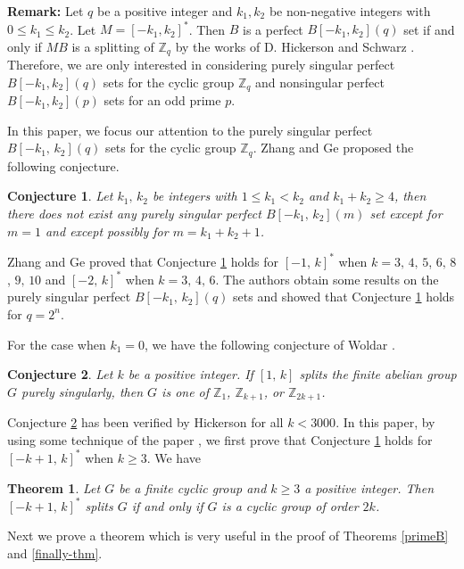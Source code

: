 \documentclass[12pt]{article}
\newtheorem{thm}{Theorem}[section]
\newtheorem{open problem}{Open problem}[section]
\newtheorem{conj}{Conjecture}[section]
\begin{document}
{\bf Remark:}  Let $q$ be a positive integer and $k_1, k_2$ be non-negative
integers with $0\le  k_1\le  k_2$. Let $M=[-k_1, k_2]^\ast$. Then $B$ is a perfect $B[-k_1, k_2](q)$ set if and only if $MB$ is a splitting of $\mathbb{Z}_q$ by the works of D. Hickerson \cite{[H]} and Schwarz \cite{[SC]}. Therefore, we are only interested in considering  purely singular perfect $B[-k_1, k_2](q)$ sets for the cyclic group $\mathbb{Z}_q$ and nonsingular  perfect $B[-k_1, k_2](p)$ sets for an odd prime $p$.

In this paper, we focus our attention to the purely singular perfect $B[-k_1, \,k_2](q)$ sets for the cyclic group $\mathbb{Z}_q$. Zhang and Ge \cite{[ZG]} proposed the following conjecture.


\begin{conj} \label{conj}
Let $k_1, \,k_2$ be integers with $1 \le k_1 < k_2$ and
$k_1 + k_2\ge 4$, then there does not exist any purely singular
perfect $B[-k_1, \,k_2](m)$ set except for $m = 1$ and except possibly for $m = k_1 + k_2 + 1$.
\end{conj}




Zhang and Ge \cite{[ZG]} proved that Conjecture  \ref{conj} holds for $[-1, \,k]^\ast$ when $k=3, \,4, \,5$, $6, \,8$, $9, \,10$ and $[-2, \,k]^\ast$ when $k=3, \,4, \,6$. The authors \cite{[PK]} obtain some results on the purely singular
perfect $B[-k_1, \,k_2](q)$ sets and showed that Conjecture  \ref{conj} holds
 for $q=2^n$.

For the case when $k_1=0$, we have the following conjecture of Woldar \cite{[W]}.

\begin{conj} \label{conj1} Let $k$ be a positive integer. If $[1, \, k]$ splits the finite abelian group $G$ purely singularly, then $G$
is one of $\mathbb{Z}_1$, $\mathbb{Z}_{k + 1}$, or $\mathbb{Z}_{2k + 1}$.\end{conj}

Conjecture \ref{conj1} has been verified by Hickerson \cite{[W]} for all $k < 3000$. In this paper, by using some technique of the paper \cite{[PK]}, we first prove that  Conjecture  \ref{conj} holds for $[-k+1, \,k]^\ast$ when $k\ge3$. We have

\begin{thm} \label{minus=1-splitting}
Let $G$ be a finite cyclic group and $k\ge3$ a positive integer. Then $[-k+1, \,k]^*$ splits $G$ if and only if $G$ is a cyclic group of order $2k$.
\end{thm}
Next we prove a theorem which is very useful in the proof of Theorems \ref{primeB} and \ref{finally-thm}.
\end{document}
